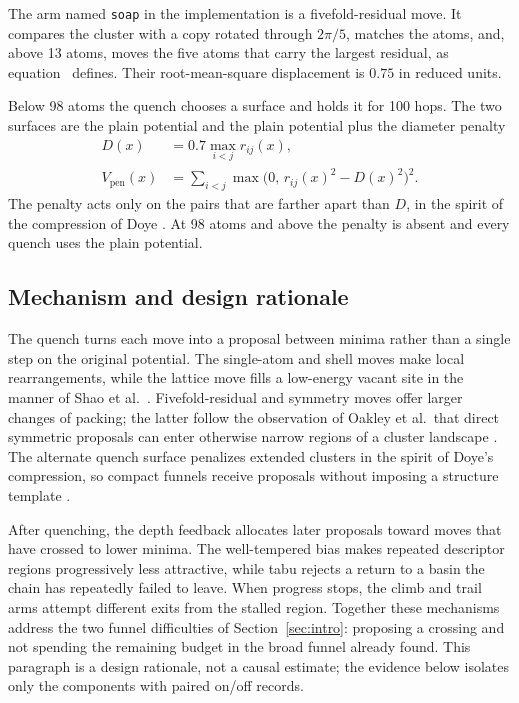 \documentclass[journal=jctcce,manuscript=article]{achemso}
\begin{document}
The arm named \texttt{soap} in the implementation is a fivefold-residual
move.
It compares the cluster with a copy rotated through \(2\pi/5\), matches the
atoms, and, above 13 atoms, moves the five atoms that carry the largest
residual, as equation~ defines.
Their root-mean-square displacement is \(0.75\) in reduced units.

Below 98 atoms the quench chooses a surface and holds it for 100 hops.
The two surfaces are the plain potential and the plain potential plus
the diameter penalty
\begin{equation}
\begin{aligned}
D(x) &= 0.7 \max_{i<j} r_{ij}(x),\\
V_{\mathrm{pen}}(x) &= \sum_{i<j}
\max\bigl(0,\, r_{ij}(x)^2 - D(x)^2\bigr)^2.
\end{aligned}
\label{eq:penalty}
\end{equation}
The penalty acts only on the pairs that are farther apart than \(D\), in the
spirit of the compression of Doye \cite{doye2000}.
At 98 atoms and above the penalty is absent and every quench uses the
plain potential.

\subsection{Mechanism and design rationale}
\label{sec:mechanism}
The quench turns each move into a proposal between minima rather than a
single step on the original potential.
The single-atom and shell moves make local rearrangements, while the lattice
move fills a low-energy vacant site in the manner of Shao et al.\
\cite{shaoChengCai2004}.
Fivefold-residual and symmetry moves offer larger changes of packing; the latter
follow the observation of Oakley et al.\ that direct symmetric proposals can
enter otherwise narrow regions of a cluster landscape \cite{oakley2013}.
The alternate quench surface penalizes extended clusters in the spirit of
Doye's compression, so compact funnels receive proposals without imposing a
structure template \cite{doye2000}.

After quenching, the depth feedback allocates later proposals toward moves
that have crossed to lower minima.
The well-tempered bias makes repeated descriptor regions progressively less
attractive, while tabu rejects a return to a basin the chain has repeatedly
failed to leave.
When progress stops, the climb and trail arms attempt different exits from
the stalled region.
Together these mechanisms address the two funnel difficulties of
Section~\ref{sec:intro}: proposing a crossing and not spending the remaining
budget in the broad funnel already found.
This paragraph is a design rationale, not a causal estimate; the evidence
below isolates only the components with paired on/off records.
\end{document}
